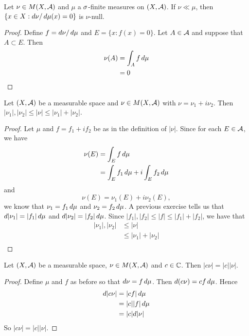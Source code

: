 \documentclass{book}
\begin{document}
	\begin{ex}  
		Let $\nu \in M(X, \mathcal{A})$ and $\mu$ a $\sigma$-finite measures on $(X,\mathcal{A})$. If $\nu \ll \mu$, then $\{x \in X: d\nu / \, d \mu(x) = 0 \}$ is $\nu$-null.
	\end{ex}
	
	\begin{proof}
		Define $f = d\nu / \, d \mu$ and $E = \{x: f(x) = 0\}$. Let $A \in \mathcal{A}$ and suppose that $A \subset E$. Then 
		\begin{align*}
			\nu(A) 
			&= \int_A f \, d \mu\\
			&= 0
		\end{align*} 
	\end{proof}
	
	\begin{ex}  
		Let $(X, \mathcal{A})$ be a measurable space and $\nu \in M(X, \mathcal{A})$ with $\nu = \nu_1 + i\nu_2$. Then $|\nu_1|, |\nu_2| \leq |\nu| \leq |\nu_1| + |\nu_2|$.
		
	\end{ex}
	
	\begin{proof}
		Let $\mu$ and $f = f_1 + i f_2$ be as in the definition of $|\nu|$. Since for each $E \in \mathcal{A}$, we have 
		\begin{align*}
			\nu(E) 
			&= \int_E f \, d \mu\\
			&= \int_E f_1 \, d \mu + i \int_E f_2 \, d \mu
		\end{align*}
		and $$\nu(E) = \nu_1(E) + i\nu_2(E),$$
		we know that $\nu_1 = f_1 \, d \mu$ and $\nu_2 = f_2 \, d \mu$. 
		A previous exercise tells us that $d|\nu_1| = |f_1|\, d \mu$ and $d |\nu_2| = |f_2|\, d \mu$. Since $|f_1|, |f_2| \leq |f| \leq |f_1|+|f_2|$, we have that 
		\begin{align*}
			|\nu_1|, |\nu_2| 
			&\leq |\nu| \\
			&\leq |\nu_1| + |\nu_2|\\
		\end{align*}
	\end{proof}
	
	\begin{ex}  
		Let  $(X, \mathcal{A})$ be a measurable space, $\nu \in M(X, \mathcal{A})$ and $c \in \mathbb{C}$. Then $| c \nu | = | c | | \nu |$.
	\end{ex}
	
	\begin{proof}
		Define $\mu$ and $f$ as before so that $d \nu = f \, d \mu$. Then $d (c \nu) = c f \, d \mu$. Hence 
		\begin{align*}
			d | c \nu | 
			&= | cf | \, d \mu \\
			&= | c | | f | \, d \mu\\
			&= | c | d| \nu |
		\end{align*}
		So $| c \nu | = | c | |  \nu |$.
	\end{proof}
\end{document}
